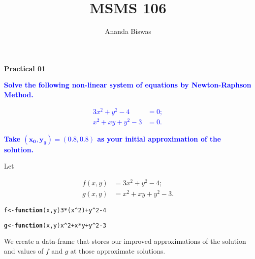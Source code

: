 \documentclass[11pt, a4paper]{article}\usepackage[]{graphicx}\usepackage[]{xcolor}
\title{MSMS 106}
\author{Ananda Biswas}
\date{}
\makeatletter
\newcommand{\hlnum}[1]{\textcolor[rgb]{0.686,0.059,0.569}{#1}}%
\newcommand{\hlopt}[1]{\textcolor[rgb]{0,0,0}{#1}}%
\newcommand{\hldef}[1]{\textcolor[rgb]{0.345,0.345,0.345}{#1}}%
\newcommand{\hlkwa}[1]{\textcolor[rgb]{0.161,0.373,0.58}{\textbf{#1}}}%
\newcommand{\hlkwb}[1]{\textcolor[rgb]{0.69,0.353,0.396}{#1}}%
\newcommand{\hlkwc}[1]{\textcolor[rgb]{0.333,0.667,0.333}{#1}}%
\newenvironment{kframe}{%
 \def\at@end@of@kframe{}%
 \ifinner\ifhmode%
  \def\at@end@of@kframe{\end{minipage}}%
  \begin{minipage}{\columnwidth}%
 \fi\fi%
 \def\FrameCommand##1{\hskip\@totalleftmargin \hskip-\fboxsep
 \colorbox{shadecolor}{##1}\hskip-\fboxsep
     \hskip-\linewidth \hskip-\@totalleftmargin \hskip\columnwidth}%
 \MakeFramed {\advance\hsize-\width
   \@totalleftmargin\z@ \linewidth\hsize
   \@setminipage}}%
 {\par\unskip\endMakeFramed%
 \at@end@of@kframe}
\newenvironment{knitrout}{}{} %
\makeatother
\begin{document}
\maketitle

\begin{center}
\textbf{Practical 01}
\end{center}

\smallpencil \hspace{0.5cm} \textcolor{blue}{\textbf{Solve the following non-linear system of equations by Newton-Raphson Method.}}

\textcolor{blue}{
\begin{align*}
  3x^2 + y^2 - 4 &= 0; \\
  x^2 + xy + y^2 - 3 &= 0.
\end{align*}
}

\textcolor{blue}{\textbf{Take $\mathbf{(x_0, y_0) = (0.8, 0.8)}$ as your initial approximation of the solution.}}

\vspace{0.5cm}

\faArrowAltCircleRight[regular] \hspace{0.5cm} Let

\begin{align*}
  f(x, y) &= 3x^2 + y^2 - 4 ; \\
  g(x, y) &= x^2 + xy + y^2 - 3 .
\end{align*}


\begin{knitrout}\footnotesize
{}\color{fgcolor}\begin{kframe}
\begin{alltt}
\hldef{f} \hlkwb{<-} \hlkwa{function}\hldef{(}\hlkwc{x}\hldef{,} \hlkwc{y}\hldef{)} \hlnum{3}\hlopt{*}\hldef{(x}\hlopt{^}\hlnum{2}\hldef{)} \hlopt{+} \hldef{y}\hlopt{^}\hlnum{2} \hlopt{-} \hlnum{4}

\hldef{g} \hlkwb{<-} \hlkwa{function}\hldef{(}\hlkwc{x}\hldef{,} \hlkwc{y}\hldef{) x}\hlopt{^}\hlnum{2} \hlopt{+} \hldef{x}\hlopt{*}\hldef{y} \hlopt{+} \hldef{y}\hlopt{^}\hlnum{2} \hlopt{-} \hlnum{3}
\end{alltt}
\end{kframe}
\end{knitrout}

We create a data-frame that stores our improved approximations of the solution and values of $f$ and $g$ at those approximate solutions.
\end{document}
